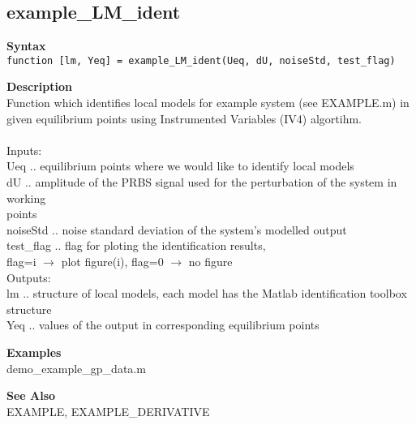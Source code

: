\subsection*{example\_LM\_ident} \label{fun:example_LM_ident}


\textbf{Syntax}
\\  \texttt{function [lm, Yeq] = example\_LM\_ident(Ueq, dU, noiseStd,
test\_flag)}

\textbf{Description}
\\ Function which identifies local models for example system (see
 EXAMPLE.m) in given equilibrium points using Instrumented
Variables  (IV4) algortihm.
\\
\\ Inputs:
\\ Ueq .. equilibrium points where we would like to identify local models
\\ dU .. amplitude of the PRBS signal used for the perturbation of the
   system in working
   \\ \tab  points
\\ noiseStd .. noise standard deviation of the system's modelled output
\\ test\_flag .. flag for ploting the identification results,
 \\ \tab  flag=i $\rightarrow$ plot figure(i), flag=0 $\rightarrow$ no figure
\\ Outputs:
\\ lm .. structure of local models, each model has the Matlab identification
  toolbox structure
\\ Yeq .. values of the output in corresponding equilibrium points

\textbf{Examples}
\\ demo\_example\_gp\_data.m

\textbf{See Also}
\\ EXAMPLE, EXAMPLE\_DERIVATIVE
